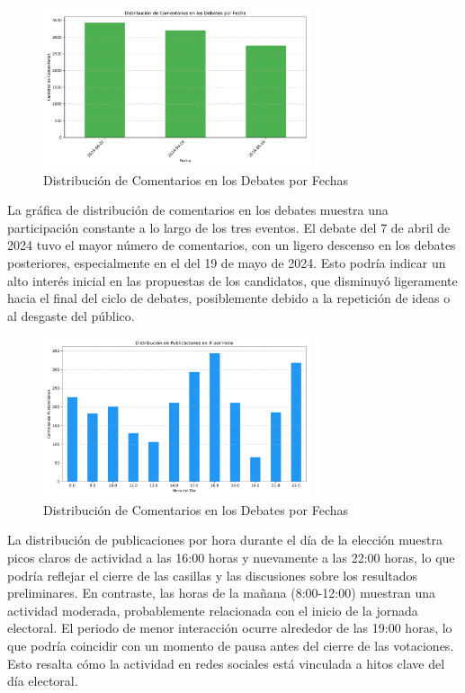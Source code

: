 \documentclass[10pt, a4paper]{article}
\begin{document}
	\begin{figure}[h!]
		\centering
		\includegraphics[width=0.7\textwidth]{comentarios_fecha.pdf} %
		\vspace{-3mm}
		\caption{Distribución de Comentarios en los Debates por Fechas}
		\label{fig:temporalDebates} %
	\end{figure}
	
	La gráfica de distribución de comentarios en los debates muestra una participación constante a lo largo de los tres eventos. El debate del 7 de abril de 2024 tuvo el mayor número de comentarios, con un ligero descenso en los debates posteriores, especialmente en el del 19 de mayo de 2024. Esto podría indicar un alto interés inicial en las propuestas de los candidatos, que disminuyó ligeramente hacia el final del ciclo de debates, posiblemente debido a la repetición de ideas o al desgaste del público.
	
	\begin{figure}[h!]
		\centering
		\includegraphics[width=0.7\textwidth]{publicaciones_por_hora.pdf} %
		\vspace{-3mm}
		\caption{Distribución de Comentarios en los Debates por Fechas}
		\label{fig:temporalDiaEleccion} %
	\end{figure}
	
	La distribución de publicaciones por hora durante el día de la elección muestra picos claros de actividad a las 16:00 horas y nuevamente a las 22:00 horas, lo que podría reflejar el cierre de las casillas y las discusiones sobre los resultados preliminares. En contraste, las horas de la mañana (8:00-12:00) muestran una actividad moderada, probablemente relacionada con el inicio de la jornada electoral. El periodo de menor interacción ocurre alrededor de las 19:00 horas, lo que podría coincidir con un momento de pausa antes del cierre de las votaciones. Esto resalta cómo la actividad en redes sociales está vinculada a hitos clave del día electoral.
	
\end{document}

